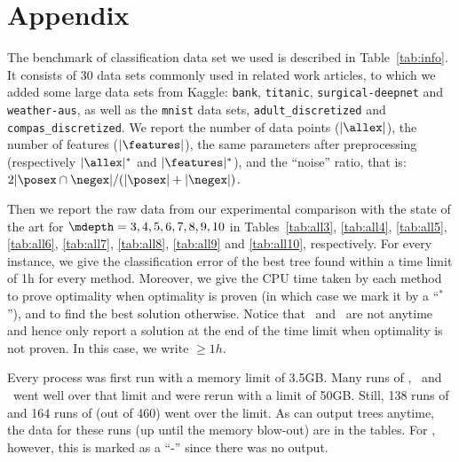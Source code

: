 \documentclass{llncs}
\begin{document}

\clearpage


\section*{Appendix}

The benchmark of classification data set we used is described in Table~\ref{tab:info}. It consists of 30 data sets 
commonly used in related work articles, to which we added some large data sets from Kaggle: \texttt{bank}, \texttt{titanic}, \texttt{surgical-deepnet} and \texttt{weather-aus}, as well as the \texttt{mnist} data sets, \texttt{adult\_discretized} and \texttt{compas\_discretized}. We report the number of data points ($|\allex|$), the number of features ($|\features|$), the same parameters after preprocessing (respectively $|\allex|^*$ and $|\features|^*$), and the ``noise'' ratio, that is: $2|\posex \cap \negex|/(|\posex|+|\negex|)$.

\medskip

Then we report the raw data from our experimental comparison with the state of the art for $\mdepth=3,4,5,6,7,8,9,10$
in Tables~\ref{tab:all3},
\ref{tab:all4},
\ref{tab:all5},
\ref{tab:all6},
\ref{tab:all7},
\ref{tab:all8},
\ref{tab:all9} and \ref{tab:all10}, respectively.
For every instance, we give the classification error of the best tree found within a time limit of 1h for every method. Moreover, we give the CPU time taken by each method to prove optimality when optimality is proven (in which case we mark it by a ``$^*$''), and to find the best solution otherwise. Notice that \cp\ and \dleight\ are not anytime and hence only report a solution at the end of the time limit when optimality is not proven. In this case, we write $\geq1h$. 

\medskip

Every process was first run with a memory limit of 3.5GB. Many runs of \dleight, \cp\ and \binoct\ went well over that limit and were rerun with a limit of 50GB. Still, 138 runs of \binoct and 164 runs of \dleight (out of 460) went over the limit. As \binoct can output trees anytime, the data for these runs (up until the memory blow-out) are in the tables. For \dleight, however, this is marked as a ``-'' since there was no output.


\renewcommand{\arraystretch}{.8}
\end{document}

